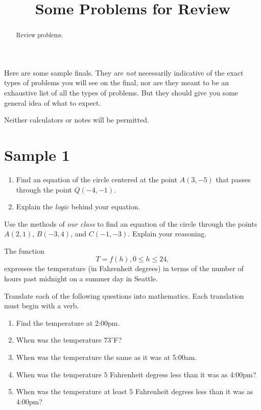 \documentclass{ximera}
\title{Some Problems for Review}
\begin{document}
\begin{abstract}
Review problems.
\end{abstract}
\maketitle

Here are some sample finals. They are \emph{not} necessarily indicative of the exact types of problems you will see on the final, nor are they meant to be an exhaustive list of all the types of problems. But they should give you some general idea of what to expect.

Neither calculators or notes will be permitted. 

\section{Sample 1}

\begin{question}  \label{Q34gt4r5t4t44}
\begin{enumerate}
\item Find an equation of the circle centered at the point $A(3,-5)$ that passes through the point $Q(-4,-1)$.

\item Explain the \emph{logic} behind your equation.
\end{enumerate}

\end{question}


\begin{question}  \label{Qdftr4tytuiiii}
Use the methods of \emph{our class} to find an equation of the circle through the points $A(2,1)$, $B(-3,4)$, and $C(-1,-3)$. Explain your reasoning. 

\end{question}


\begin{question}  \label{Qhjk88654g6}
The function 
\[
         T =  f(h) , 0\leq h \leq 24,
\]
expresses the temperature (in Fahrenheit degrees) in terms of the number of hours past midnight on a summer day in Seattle.

Translate each of the following questions into mathematics. Each translation must begin with a verb.
\begin{enumerate}
\item Find the temperature at 2:00pm.

\item When was the temperature $73^\circ$F?

\item When was the temperature the same as it was at 5:00am.

\item When was the temperature $5$ Fahrenheit degress less than it was as 4:00pm?

\item When was the temperature at least $5$ Fahrenheit degress less than it was as 4:00pm?
\end{enumerate}

\end{question}
\end{document}
